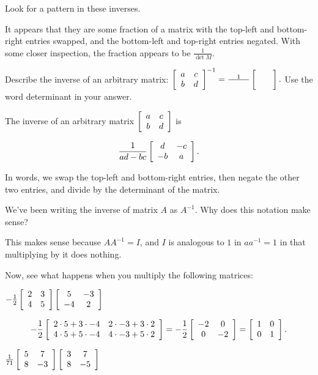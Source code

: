 \documentclass[../key.tex]{subfiles}
\begin{document}
\begin{inner_problem}[start=1]
\item Look for a pattern in these inverses.
\end{inner_problem}

It appears that they are some fraction of a matrix with the top-left and bottom-right entries swapped, and the bottom-left and top-right entries negated. With some closer inspection, the fraction appears to be $\frac{1}{\det M}$.

\begin{inner_problem}
\item Describe the inverse of an arbitrary matrix: $\left[\begin{array}{cc} a & c \\ b & d \end{array}\right]^{-1}=\frac{1}{\phantom{000000}}\left[\begin{array}{cc}  &  \\  &  \end{array}\right].$ Use the word determinant in your answer.
\end{inner_problem}

The inverse of an arbitrary matrix $\left[\begin{array}{cc} a & c \\ b & d \end{array}\right]$ is

$$\frac{1}{ad-bc}\left[\begin{array}{cc} d & -c \\ -b & a \end{array}\right].$$

In words, we swap the top-left and bottom-right entries, then negate the other two entries, and divide by the determinant of the matrix.

\begin{inner_problem}
\item We've been writing the inverse of matrix $A$ as $A^{-1}$. Why does this notation make sense?
\end{inner_problem}

This makes sense because $AA^{-1}=I$, and $I$ is analogous to $1$ in $aa^{-1}=1$ in that multiplying by it does nothing.

\begin{outer_problem}
\item Now, see what happens when you multiply the following matrices:
\end{outer_problem}

\begin{inner_problem}[start=1]
\item $-\frac{1}{2}\left[\begin{array}{cc} 2 & 3 \\ 4 & 5 \end{array}\right]\left[\begin{array}{cc} 5 & -3 \\ -4 & 2 \end{array}\right]$
\end{inner_problem}

$$-\frac{1}{2}\left[\begin{array}{cc} 2\cdot 5 + 3\cdot -4 & 2\cdot -3 + 3\cdot 2 \\ 4\cdot 5 + 5\cdot -4 & 4\cdot -3 + 5\cdot 2 \end{array}\right] = -\frac{1}{2}\left[\begin{array}{cc} -2 & 0 \\ 0 & -2 \end{array}\right] = \left[\begin{array}{cc} 1 & 0 \\ 0 & 1 \end{array}\right].$$

\begin{inner_problem}
\item $\frac{1}{71}\left[\begin{array}{cc} 5 & 7 \\ 8 & -3 \end{array}\right]\left[\begin{array}{cc} 3 & 7 \\ 8 & -5 \end{array}\right]$
\end{inner_problem}
\end{document}
